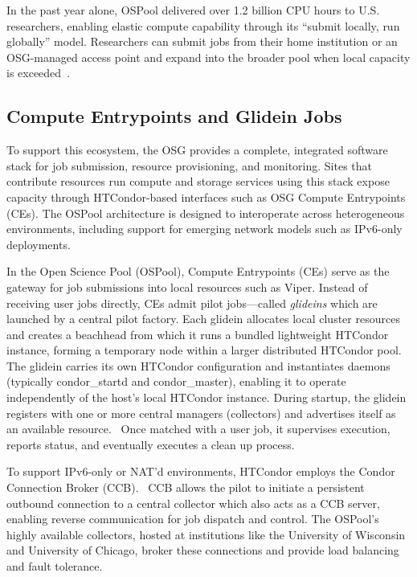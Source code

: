 \documentclass[11pt]{article}
\begin{document}
In the past year alone, OSPool delivered over 1.2 billion CPU hours to U.S. researchers, enabling elastic compute capability through its “submit locally, run globally” model. Researchers can submit jobs from their home institution or an OSG-managed access point and expand into the broader pool when local capacity is exceeded~\cite{ospoolutil}.


\subsection{Compute Entrypoints and Glidein Jobs}
To support this ecosystem, the OSG provides a complete, integrated software stack for job submission, resource provisioning, and monitoring. Sites that contribute resources run compute and storage services using this stack expose capacity through HTCondor-based interfaces such as OSG Compute Entrypoints (CEs). The OSPool architecture is designed to interoperate across heterogeneous environments, including support for emerging network models such as IPv6-only deployments.

In the Open Science Pool (OSPool), Compute Entrypoints (CEs) serve as the gateway for job submissions into local resources such as Viper. Instead of receiving  user jobs directly, CEs admit pilot jobs—called {\it glideins} which are launched by a central pilot factory. Each glidein allocates local cluster resources and creates a beachhead from which it runs a bundled lightweight HTCondor instance, forming a temporary node within a larger distributed HTCondor pool. The glidein carries its own HTCondor configuration and instantiates daemons (typically condor\_startd and condor\_master), enabling it to operate independently of the host's local HTCondor instance. During startup, the glidein registers with one or more central managers (collectors) and advertises itself as an available resource.~\cite{htcondor,glideinwms} Once matched with a user job, it supervises execution, reports status, and eventually executes a clean up process. 

To support IPv6-only or NAT'd environments, HTCondor employs the Condor Connection Broker (CCB).~\cite{ccbdesign} CCB allows the pilot to initiate a persistent outbound connection to a central collector which also acts as a CCB server, enabling reverse communication for job dispatch and control. The OSPool's highly available collectors, hosted at institutions like the University of Wisconsin and University of Chicago, broker these connections and provide load balancing and fault tolerance.
\end{document}
